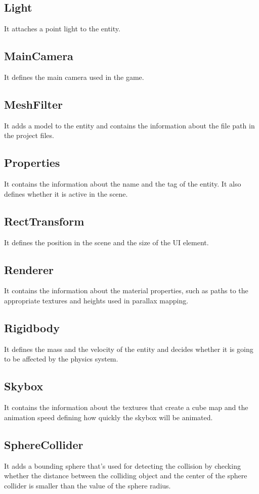 \documentclass[12pt, english]{article}
\begin{document}
\subsection{Light}
It attaches a point light to the entity.

\subsection{MainCamera}
It defines the main camera used in the game.

\subsection{MeshFilter}
It adds a model to the entity and contains the information about the file path
in the project files.

\subsection{Properties}
It contains the information about the name and the tag of the entity. It also
defines whether it is active in the scene.

\subsection{RectTransform}
It defines the position in the scene and the size of the UI element.

\subsection{Renderer}
It contains the information about the material properties, such as paths to the
appropriate textures and heights used in parallax mapping.

\subsection{Rigidbody}
It defines the mass and the velocity of the entity and decides whether it is
going to be affected by the physics system.

\subsection{Skybox}
It contains the information about the textures that create a cube map and the
animation speed defining how quickly the skybox will be animated.

\subsection{SphereCollider}
It adds a bounding sphere that's used for detecting the collision by checking
whether the distance between the colliding object and the center of the sphere
collider is smaller than the value of the sphere radius.
\end{document}
